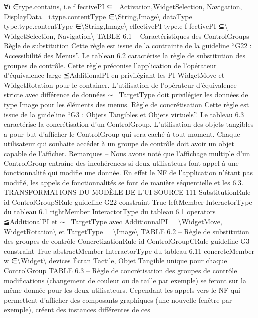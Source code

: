 \documentclass{article}
\begin{document}
∀i ∈type.contains,
i.e f fectivePI ⊆
 Activation,WidgetSelection,
Navigation, DisplayData

i.type.contentType ∈\textbackslash{}{String,Image\textbackslash{}}
dataType
type.type.contentType ∈\textbackslash{}{String,Image\textbackslash{}}
effectivePI
type.e f fectivePI ⊆\textbackslash{}{ WidgetSelection, Navigation\textbackslash{}}
TABLE 6.1 – Caract\'{e}ristiques des ControlGroups
R\`{e}gle de substitution
Cette r\`{e}gle est issue de la contrainte de la guideline “G22 : Accessibilit\'{e} des
Menus”. Le tableau 6.2 caract\'{e}rise la r\`{e}gle de substitution des groupes de contr\^{o}le. Cette r\`{e}gle pr\'{e}conise l’application de l’op\'{e}rateur d’\'{e}quivalence large ≦AdditionalPI en privil\'{e}giant les PI WidgetMove
et WidgetRotation pour le container. L’utilisation de l’op\'{e}rateur d’\'{e}quivalence stricte avec diff\'{e}rence
de donn\'{e}es ∼=TargetType doit privil\'{e}gier les donn\'{e}es de type Image pour les \'{e}l\'{e}ments des menus.
R\`{e}gle de concr\'{e}tisation
Cette r\`{e}gle est issue de la guideline “G3 : Objets Tangibles et Objets
virtuels”. Le tableau 6.3 caract\'{e}rise la concr\'{e}tisation d’un ControlGroup. L’utilisation des objets tangibles a pour but d’afﬁcher le ControlGroup qui sera cach\'{e} \`{a} tout moment. Chaque utilisateur qui
souhaite acc\'{e}der \`{a} un groupe de contr\^{o}le doit avoir un objet capable de l’afﬁcher.
Remarques
– Nous avons not\'{e} que l’afﬁchage multiple d’un ControlGroup entra\^{i}ne des incoh\'{e}rences si deux
utilisateurs font appel \`{a} une fonctionnalit\'{e} qui modiﬁe une donn\'{e}e. En effet le NF de l’application n’\'{e}tant pas modiﬁ\'{e}, les appels de fonctionnalit\'{e}s se font de mani\`{e}re s\'{e}quentielle et les
6.3. TRANSFORMATIONS DU MODÈLE DE L’UI SOURCE
111
SubstitutionRule
id
ControlGroupSRule
guideline
G22
constraint
True
leftMember
InteractorType du tableau 6.1
rightMember
InteractorType du tableau 6.1
operators
≦AdditionalPI et ∼=TargetType
avec AdditionnalPI = \textbackslash{}{WidgetMove, WidgetRotation\textbackslash{}}
et TargetType = \textbackslash{}{Image\textbackslash{}}
TABLE 6.2 – R\`{e}gle de substitution des groupes de contr\^{o}le
ConcretizationRule
id
ControlGroupCRule
guideline
G3
constraint
True
abstractMember
InteractorType du tableau 6.11
concreteMember
w ∈\textbackslash{}{Widget\textbackslash{}}
devices
Écran Tactile, Objet Tangible unique pour chaque ControlGroup
TABLE 6.3 – R\`{e}gle de concr\'{e}tisation des groupes de contr\^{o}le
modiﬁcations (changement de couleur ou de taille par exemple) se feront sur la m\^{e}me donn\'{e}e
pour les deux utilisateurs. Cependant les appels vers le NF qui permettent d’afﬁcher des composants graphiques (une nouvelle fen\^{e}tre par exemple), cr\'{e}ent des instances diff\'{e}rentes de ces
\end{document}
